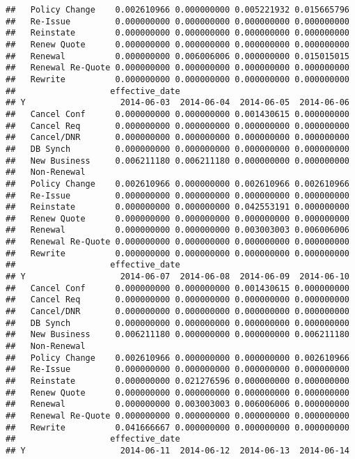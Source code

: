\documentclass[]{article}
\begin{document}
\begin{verbatim}
##   Policy Change    0.002610966 0.000000000 0.005221932 0.015665796
##   Re-Issue         0.000000000 0.000000000 0.000000000 0.000000000
##   Reinstate        0.000000000 0.000000000 0.000000000 0.000000000
##   Renew Quote      0.000000000 0.000000000 0.000000000 0.000000000
##   Renewal          0.000000000 0.006006006 0.000000000 0.015015015
##   Renewal Re-Quote 0.000000000 0.000000000 0.000000000 0.000000000
##   Rewrite          0.000000000 0.000000000 0.000000000 0.000000000
##                   effective_date
## Y                   2014-06-03  2014-06-04  2014-06-05  2014-06-06
##   Cancel Conf      0.000000000 0.000000000 0.001430615 0.000000000
##   Cancel Req       0.000000000 0.000000000 0.000000000 0.000000000
##   Cancel/DNR       0.000000000 0.000000000 0.000000000 0.000000000
##   DB Synch         0.000000000 0.000000000 0.000000000 0.000000000
##   New Business     0.006211180 0.006211180 0.000000000 0.000000000
##   Non-Renewal                                                     
##   Policy Change    0.002610966 0.000000000 0.002610966 0.002610966
##   Re-Issue         0.000000000 0.000000000 0.000000000 0.000000000
##   Reinstate        0.000000000 0.000000000 0.042553191 0.000000000
##   Renew Quote      0.000000000 0.000000000 0.000000000 0.000000000
##   Renewal          0.000000000 0.000000000 0.003003003 0.006006006
##   Renewal Re-Quote 0.000000000 0.000000000 0.000000000 0.000000000
##   Rewrite          0.000000000 0.000000000 0.000000000 0.000000000
##                   effective_date
## Y                   2014-06-07  2014-06-08  2014-06-09  2014-06-10
##   Cancel Conf      0.000000000 0.000000000 0.001430615 0.000000000
##   Cancel Req       0.000000000 0.000000000 0.000000000 0.000000000
##   Cancel/DNR       0.000000000 0.000000000 0.000000000 0.000000000
##   DB Synch         0.000000000 0.000000000 0.000000000 0.000000000
##   New Business     0.006211180 0.000000000 0.000000000 0.006211180
##   Non-Renewal                                                     
##   Policy Change    0.002610966 0.000000000 0.000000000 0.002610966
##   Re-Issue         0.000000000 0.000000000 0.000000000 0.000000000
##   Reinstate        0.000000000 0.021276596 0.000000000 0.000000000
##   Renew Quote      0.000000000 0.000000000 0.000000000 0.000000000
##   Renewal          0.000000000 0.003003003 0.006006006 0.000000000
##   Renewal Re-Quote 0.000000000 0.000000000 0.000000000 0.000000000
##   Rewrite          0.041666667 0.000000000 0.000000000 0.000000000
##                   effective_date
## Y                   2014-06-11  2014-06-12  2014-06-13  2014-06-14

\end{verbatim}
\end{document}

